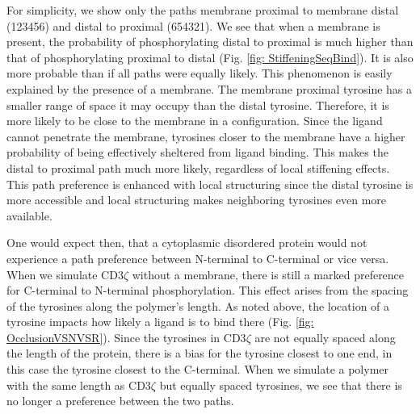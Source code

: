 \documentclass[../../AdvancementSummary.tex]{subfiles}
\begin{document}
For simplicity, we show only the paths membrane proximal to membrane distal (123456) and distal to proximal (654321). We see that when a membrane is present, the probability of phosphorylating distal to proximal is much higher than that of phosphorylating proximal to distal (Fig. \ref{fig: StiffeningSeqBind}). It is also more probable than if all paths were equally likely. This phenomenon is easily explained by the presence of a membrane. The membrane proximal tyrosine has a smaller range of space it may occupy than the distal tyrosine. Therefore, it is more likely to be close to the membrane in a configuration. Since the ligand cannot penetrate the membrane, tyrosines closer to the membrane have a higher probability of being effectively sheltered from ligand binding. This makes the distal to proximal path much more likely, regardless of local stiffening effects. This path preference is enhanced with local structuring since the distal tyrosine is more accessible and local structuring makes neighboring tyrosines even more available.

One would expect then, that a cytoplasmic disordered protein would not experience a path preference between N-terminal to C-terminal or vice versa. When we simulate CD3$\zeta$ without a membrane, there is still a marked preference for C-terminal to N-terminal phosphorylation. This effect arises from the spacing of the tyrosines along the polymer's length. As noted above, the location of a tyrosine impacts how likely a ligand is to bind there (Fig. \ref{fig: OcclusionVSNVSR}). Since the tyrosines in CD3$\zeta$ are not equally spaced along the length of the protein, there is a bias for the tyrosine closest to one end, in this case the tyrosine closest to the C-terminal. When we simulate a polymer with the same length as CD3$\zeta$ but equally spaced tyrosines, we see that there is no longer a preference between the two paths.
\end{document}
